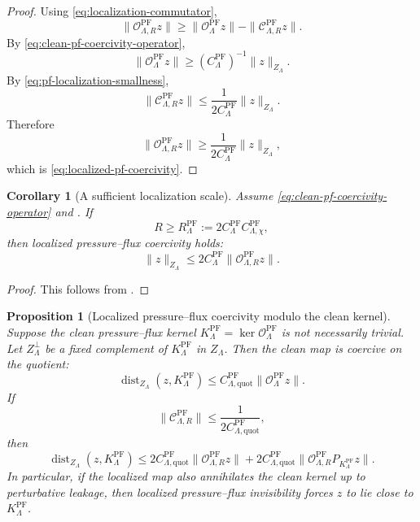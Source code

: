 \documentclass[11pt]{article}
\numberwithin{equation}{section}
\theoremstyle{plain}
\newtheorem{proposition}[theorem]{Proposition}
\newtheorem{corollary}[theorem]{Corollary}
\theoremstyle{definition}
\theoremstyle{remark}
\newcommand{\PF}{\mathrm{PF}}
\newcommand{\quot}{\mathrm{quot}}
\newcommand{\dist}{\operatorname{dist}}
\newcommand{\calC}{\mathcal C}
\newcommand{\calO}{\mathcal O}
\begin{document}
\begin{proof}
Using \eqref{eq:localization-commutator},
\[
        \|\calO^{\PF}_{\Lambda,R}z\|
        \ge
        \|\calO^{\PF}_\Lambda z\|-
        \|\calC^{\PF}_{\Lambda,R}z\|.
\]
By \eqref{eq:clean-pf-coercivity-operator},
\[
        \|\calO^{\PF}_\Lambda z\|
        \ge
        (C^{\PF}_\Lambda)^{-1}\|z\|_{Z_\Lambda}.
\]
By \eqref{eq:pf-localization-smallness},
\[
        \|\calC^{\PF}_{\Lambda,R}z\|
        \le
        \frac{1}{2C^{\PF}_\Lambda}\|z\|_{Z_\Lambda}.
\]
Therefore
\[
        \|\calO^{\PF}_{\Lambda,R}z\|
        \ge
        \frac{1}{2C^{\PF}_\Lambda}\|z\|_{Z_\Lambda},
\]
which is \eqref{eq:localized-pf-coercivity}.
\end{proof}

\begin{corollary}[A sufficient localization scale]
\label{cor:sufficient-localization-scale}
Assume \eqref{eq:clean-pf-coercivity-operator} and .  If
\[
        R\ge
        R^{\PF}_\Lambda
        :=2C^{\PF}_\Lambda C^{\PF}_{\Lambda,\chi},
\]
then localized pressure--flux coercivity holds:
\[
        \|z\|_{Z_\Lambda}
        \le
        2C^{\PF}_\Lambda
        \|\calO^{\PF}_{\Lambda,R}z\|.
\]
\end{corollary}

\begin{proof}
This follows from .
\end{proof}

\begin{proposition}[Localized pressure--flux coercivity modulo the clean kernel]
\label{prop:pf-localized-quotient-stability}
Suppose the clean pressure--flux kernel \(K^{\PF}_\Lambda=\ker\calO^{\PF}_\Lambda\) is not necessarily trivial.  Let \(Z_\Lambda^\perp\) be a fixed complement of \(K^{\PF}_\Lambda\) in \(Z_\Lambda\).  Then the clean map is coercive on the quotient:
\begin{equation}
        \dist_{Z_\Lambda}(z,K^{\PF}_\Lambda)
        \le
        C^{\PF}_{\Lambda,\quot}
        \|\calO^{\PF}_\Lambda z\|.
        \label{eq:pf-quotient-coercivity}
\end{equation}
If
\begin{equation}
        \|\calC^{\PF}_{\Lambda,R}\|
        \le
        \frac{1}{2C^{\PF}_{\Lambda,\quot}},
        \label{eq:pf-quotient-smallness}
\end{equation}
then
\begin{equation}
        \dist_{Z_\Lambda}(z,K^{\PF}_\Lambda)
        \le
        2C^{\PF}_{\Lambda,\quot}
        \|\calO^{\PF}_{\Lambda,R}z\|
        +
        2C^{\PF}_{\Lambda,\quot}
        \|\calO^{\PF}_{\Lambda,R}P_{K^{\PF}_\Lambda}z\|.
        \label{eq:localized-quotient-stability}
\end{equation}
In particular, if the localized map also annihilates the clean kernel up to perturbative leakage, then localized pressure--flux invisibility forces \(z\) to lie close to \(K^{\PF}_\Lambda\).
\end{proposition}
\end{document}

